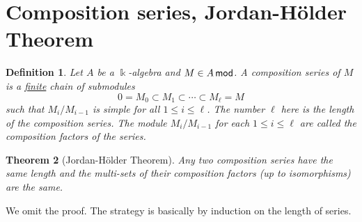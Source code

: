 \documentclass[11pt,a4paper]{article}
\numberwithin{equation}{section}
\theoremstyle{all}
\newtheorem{theorem}{Theorem}[section]
\newtheorem{definition}[theorem]{Definition}
\theoremstyle{remark}
\newcommand{\defn}[1]{\textsl{\color{darkblue} #1}}
\begin{document}
\pagebreak


\section{Composition series, Jordan-H\"{o}lder Theorem}

\begin{definition}
Let $A$ be a $\Bbbk$-algebra and $M\in A\mod$.
A \defn{composition series} of $M$ is a \underline{finite} chain of submodules
\[
0=M_{0} \subset M_{1} \subset \cdots \subset M_\ell = M
\]
such that $M_i/M_{i-1}$ is simple for all $1\leq i \leq \ell$.   The number $\ell$ here is the \defn{length} of the composition series.  The module $M_i/M_{i-1}$ for each $1\leq i\leq \ell$ are called the \defn{composition factors} of the series.
\end{definition}


\begin{theorem}[Jordan-H\"{o}lder Theorem]
Any two composition series have the same length and the multi-sets of their composition factors (up to isomorphisms) are the same.
\end{theorem}
We omit the proof.  The strategy is basically by induction on the length of series.
\end{document}
